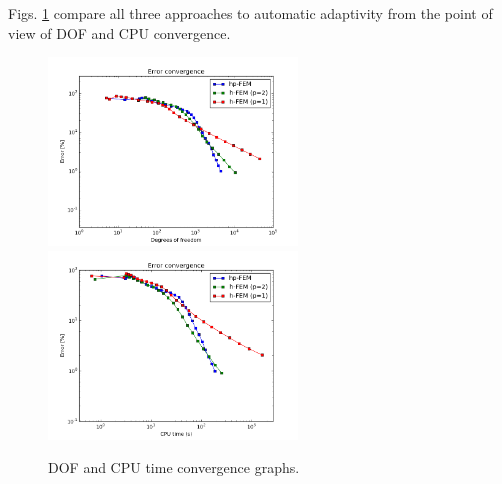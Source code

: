 Figs. \ref{fig:nist-12-conv} compare all
three approaches to automatic adaptivity from the point
of view of DOF and CPU convergence.

\begin{figure}[!ht]
\centering
\includegraphics[height=5cm]{nist/nist-12/conv_dof_aniso.png}\ \
\includegraphics[height=5cm]{nist/nist-12/conv_cpu_aniso.png}
\caption{DOF and CPU time convergence graphs.}
\label{fig:nist-12-conv}
\end{figure}

